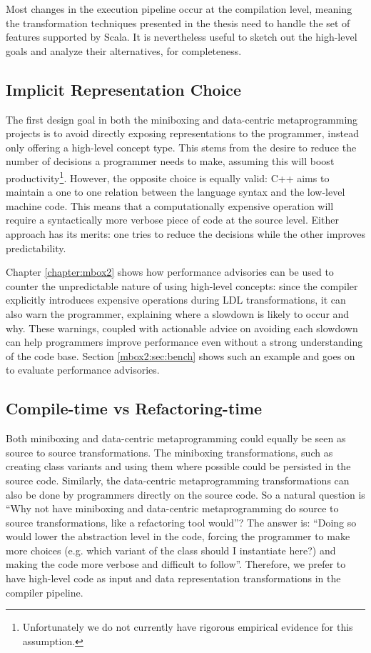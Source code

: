 Most changes in the execution pipeline occur at the compilation level, meaning the transformation techniques presented in the thesis need to handle the set of features supported by Scala. It is nevertheless useful to sketch out the high-level goals and analyze their alternatives, for completeness.

\subsection{Implicit Representation Choice}

The first design goal in both the miniboxing and data-centric metaprogramming projects is to avoid directly exposing representations to the programmer, instead only offering a high-level concept type. This stems from the desire to reduce the number of decisions a programmer needs to make, assuming this will boost productivity\footnote{Unfortunately we do not currently have rigorous empirical evidence for this assumption.}. However, the opposite choice is equally valid: C++ aims to maintain a one to one relation between the language syntax and the low-level machine code. This means that a computationally expensive operation will require a syntactically more verbose piece of code at the source level. Either approach has its merits: one tries to reduce the decisions while the other improves predictability.

Chapter \ref{chapter:mbox2} shows how performance advisories can be used to counter the unpredictable nature of using high-level concepts: since the compiler explicitly introduces expensive operations during LDL transformations, it can also warn the programmer, explaining where a slowdown is likely to occur and why. These warnings, coupled with actionable advice on avoiding each slowdown can help programmers improve performance even without a strong understanding of the code base. Section \ref{mbox2:sec:bench} shows such an example and goes on to evaluate performance advisories.

\subsection{Compile-time vs Refactoring-time}

Both miniboxing and data-centric metaprogramming could equally be seen as source to source transformations. The miniboxing transformations, such as creating class variants and using them where possible could be persisted in the source code. Similarly, the data-centric metaprogramming transformations can also be done by programmers directly on the source code. So a natural question is ``Why not have miniboxing and data-centric metaprogramming do source to source transformations, like a refactoring tool would''? The answer is: ``Doing so would lower the abstraction level in the code, forcing the programmer to make more choices (e.g. which variant of the class should I instantiate here?) and making the code more verbose and difficult to follow''. Therefore, we prefer to have high-level code as input and data representation transformations in the compiler pipeline.

